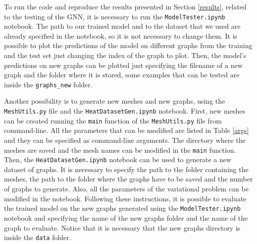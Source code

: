 \documentclass[11pt,a4paper]{article}
\begin{document}
To run the code and reproduce the results presented in Section \ref{results}, related to the testing of the GNN, it is necessary to run the \texttt{ModelTester.ipynb} notebook. The path to our trained model and to the dataset that we used are already specified in the notebook, so it is not necessary to change them. It is possible to plot the predictions of the model on different graphs from the training and the test set just changing the index of the graph to plot. Then, the model's predictions on new graphs can be plotted just specifying the filename of a new graph and the folder where it is stored, some examples that can be tested are inside the \texttt{graphs\_new} folder.

Another possibility is to generate new meshes and new graphs, using the \texttt{MeshUtils.py} file and the \texttt{HeatDatasetGen.ipynb} notebook.
First, new meshes can be created running the \texttt{main} function of the \texttt{MeshUtils.py} file from command-line. All the parameters that can be modified are listed in Table \ref{args} and they can be specified as command-line arguments. The directory where the meshes are saved and the mesh names can be modified in the \texttt{main} function. 
Then, the \texttt{HeatDatasetGen.ipynb} notebook can be used to generate a new dataset of graphs. It is necessary to specify the path to the folder containing the meshes, the path to the folder where the graphs have to be saved and the number of graphs to generate. Also, all the parameters of the variational problem can be modified in the notebook. 
Following these instructions, it is possible to evaluate the trained model on the new graphs generated using the \texttt{ModelTester.ipynb} notebook and specifying the name of the new graphs folder and the name of the graph to evaluate. Notice that it is necessary that the new graphs directory is inside the \texttt{data} folder.


\end{document}
